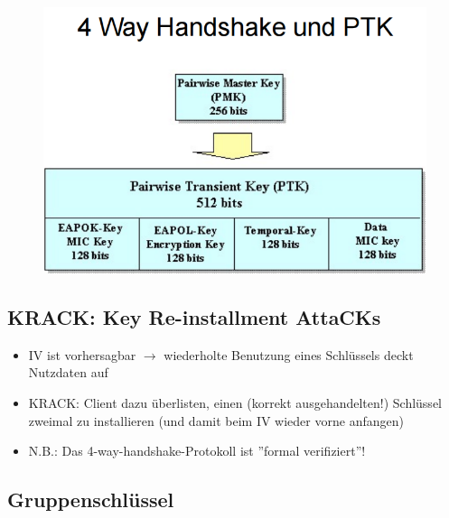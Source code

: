 \documentclass[openany]{book}
\begin{document}
\begin{figure}[h!]
    \centering
    \includegraphics[width=\linewidth]{Pics/PTKHandshake.PNG}
\end{figure}

\newpage

\subsection{KRACK: Key Re-installment AttaCKs}

\begin{itemize}
    \item IV ist vorhersagbar $\rightarrow$ wiederholte Benutzung eines Schlüssels deckt Nutzdaten auf
    \item KRACK: Client dazu überlisten, einen (korrekt ausgehandelten!) Schlüssel zweimal zu installieren (und damit beim IV wieder vorne anfangen)
    \item N.B.: Das 4-way-handshake-Protokoll ist ''formal verifiziert''!
\end{itemize}

\subsection{Gruppenschlüssel}
\end{document}

